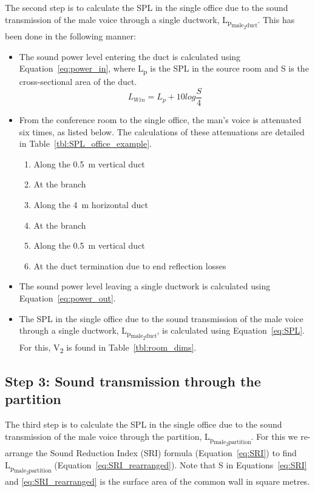 The second step is to calculate the SPL in the single office due to the sound transmission of the male voice through a single ductwork, L\textsubscript{p\textsubscript{male\textsubscript{2}duct}}.
This has been done in the following manner:
\begin{itemize}
	\item The sound power level entering the duct is calculated using Equation~\ref{eq:power_in}, where L\textsubscript{p} is the SPL in the source room and S is the cross-sectional area of the duct.
		\begin{equation}\label{eq:power_in}
			L_{W in} = L_{p} + 10 log \frac{S}{4}
		\end{equation}
	\item From the conference room to the single office, the man's voice is attenuated six times, as listed below. The calculations of these attenuations are detailed in Table~\ref{tbl:SPL_office_example}.
		\begin{enumerate}
			\item Along the 0.5~m vertical duct
			\item At the branch
			\item Along the 4~m horizontal duct
			\item At the branch
			\item Along the 0.5~m vertical duct
			\item At the duct termination due to end reflection losses
		\end{enumerate}
	\item The sound power level leaving a single ductwork is calculated using Equation~\ref{eq:power_out}.
	\item The SPL in the single office due to the sound transmission of the male voice through a single ductwork, L\textsubscript{p\textsubscript{male\textsubscript{2}duct}}, is calculated using Equation~\ref{eq:SPL}. For this, V\textsubscript{2} is found in Table~\ref{tbl:room_dims}.
\end{itemize}



\subsection{Step 3: Sound transmission through the partition}

The third step is to calculate the SPL in the single office due to the sound transmission of the male voice through the partition, L\textsubscript{p\textsubscript{male\textsubscript{2}partition}}.
For this we re-arrange the Sound Reduction Index (SRI) formula (Equation~\ref{eq:SRI}) to find L\textsubscript{p\textsubscript{male\textsubscript{2}partition}} (Equation~\ref{eq:SRI_rearranged}).
Note that S in Equations~\ref{eq:SRI} and \ref{eq:SRI_rearranged} is the surface area of the common wall in square metres.

